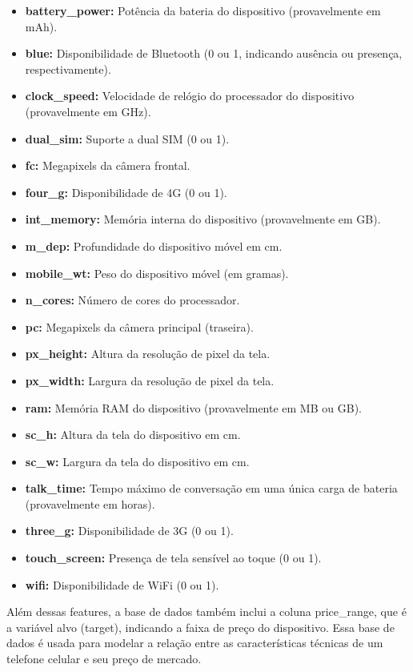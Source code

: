 \documentclass[conference]{IEEEtran}
\begin{document}
\begin{itemize}
    \item {\textbf{battery\_power:}} 
    Potência da bateria do dispositivo (provavelmente em mAh).
    \item {\textbf{blue:}}
    Disponibilidade de Bluetooth (0 ou 1, indicando ausência ou presença, respectivamente).
    \item {\textbf{clock\_speed:}}
    Velocidade de relógio do processador do dispositivo (provavelmente em GHz).
    \item {\textbf{dual\_sim:}}
    Suporte a dual SIM (0 ou 1).
    \item {\textbf{fc:}}
    Megapixels da câmera frontal.
    \item {\textbf{four\_g:}}
    Disponibilidade de 4G (0 ou 1).
    \item {\textbf{int\_memory:}}
    Memória interna do dispositivo (provavelmente em GB).
    \item {\textbf{m\_dep:}}
    Profundidade do dispositivo móvel em cm.
    \item {\textbf{mobile\_wt:}}
    Peso do dispositivo móvel (em gramas).
    \item {\textbf{n\_cores:}}
    Número de cores do processador.
    \item {\textbf{pc:}}
    Megapixels da câmera principal (traseira).
    \item {\textbf{px\_height:}}
    Altura da resolução de pixel da tela.
    \item {\textbf{px\_width:}}
    Largura da resolução de pixel da tela.
    \item {\textbf{ram:}}
    Memória RAM do dispositivo (provavelmente em MB ou GB).
    \item {\textbf{sc\_h:}}
    Altura da tela do dispositivo em cm.
    \item {\textbf{sc\_w:}}
    Largura da tela do dispositivo em cm.
    \item {\textbf{talk\_time:}}
    Tempo máximo de conversação em uma única carga de bateria (provavelmente em horas).
    \item {\textbf{three\_g:}}
    Disponibilidade de 3G (0 ou 1).
    \item {\textbf{touch\_screen:}}
    Presença de tela sensível ao toque (0 ou 1).
    \item {\textbf{wifi:}}
    Disponibilidade de WiFi (0 ou 1).
\end{itemize}

Além dessas features, a base de dados também inclui a coluna 
price\_range, que é a variável alvo (target), 
indicando a faixa de preço do dispositivo. 
Essa base de dados é usada para modelar a relação entre 
as características técnicas de um telefone celular 
e seu preço de mercado. ​
\end{document}
